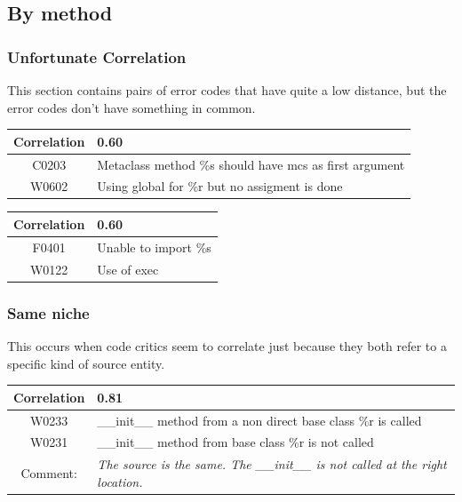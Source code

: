 \documentclass[12pt, a4paper]{article}
\newcommand{\tbf}[1]{\textbf{#1}}
\newcommand{\noi}{\noindent}
\begin{document}

\subsection{By method}

\subsubsection*{Unfortunate Correlation}
This section contains pairs of error codes that have quite a low distance, but the error codes don't have something in common.

\bigskip \noi
\begin{tabularx}{\textwidth}{|c|X|}
\hline
\tbf{Correlation}   & 0.60 \\
\hline
C0203   &  Metaclass method \%s should have mcs as first argument \\
\hline
W0602   &  Using global for \%r but no assigment is done \\
\hline
\end{tabularx}


\bigskip \noi
\begin{tabularx}{\textwidth}{|c|X|}
\hline
\tbf{Correlation}   & 0.60 \\
\hline
F0401   &  Unable to import \%s \\
\hline
W0122   &  Use of exec \\
\hline
\end{tabularx}

\subsubsection*{Same niche}
This occurs when code critics seem to correlate just because they both refer to a specific kind of source entity.

\bigskip \noi
\begin{tabularx}{\textwidth}{|c|X|}
\hline
\tbf{Correlation}   & 0.81 \\
\hline
W0233   &  \_\_init\_\_ method from a non direct base class \%r is called \\
\hline
W0231   &  \_\_init\_\_ method from base class \%r is not called \\
\hline
Comment: & \textit{The source is the same. The \_\_init\_\_ is not called at the right location.}\\
\hline
\end{tabularx}


\bigskip
\end{document}
